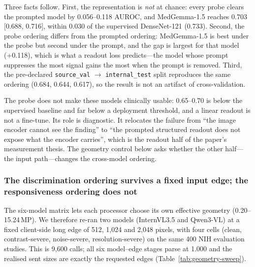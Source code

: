 Three facts follow. First, the representation is \emph{not} at chance: every probe clears
the prompted model by 0.056--0.118 AUROC, and MedGemma-1.5 reaches 0.703 [0.688, 0.716],
within 0.030 of the supervised DenseNet-121 (0.733). Second, the probe ordering differs
from the prompted ordering: MedGemma-1.5 is best under the probe but second under the
prompt, and the gap is largest for that model (+0.118), which is what a readout loss
predicts---the model whose prompt suppresses the most signal gains the most when the
prompt is removed. Third, the pre-declared
\texttt{source\_val} $\rightarrow$ \texttt{internal\_test} split reproduces the same
ordering (0.684, 0.644, 0.617), so the result is not an artifact of cross-validation.

The probe does not make these models clinically usable: 0.65--0.70 is below the supervised
baseline and far below a deployment threshold, and a linear readout is not a fine-tune.
Its role is diagnostic. It relocates the failure from ``the image encoder cannot see the
finding'' to ``the prompted structured readout does not expose what the encoder carries'',
which is the readout half of the paper's measurement thesis. The geometry control below
asks whether the other half---the input path---changes the cross-model ordering.

\subsubsection{The discrimination ordering survives a fixed input edge; the responsiveness ordering does not}
\label{sec:results-geometry}

The six-model matrix lets each processor choose its own effective geometry (0.20--15.24\,MP).
We therefore re-ran two models (InternVL3.5 and Qwen3-VL) at a fixed client-side long edge
of 512, 1,024 and 2,048 pixels, with four cells (clean, contrast-severe, noise-severe,
resolution-severe) on the same 400 NIH evaluation studies. This is 9,600 calls; all six
model--edge stages parse at 1.000 and the realised sent sizes are exactly the requested
edges (Table~\ref{tab:geometry-sweep}).

